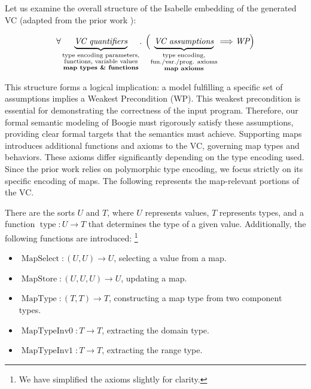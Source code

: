 \documentclass[11pt]{article}
\begin{document}
Let us examine the overall structure of the Isabelle embedding of the generated VC
(adapted from the prior work \cite{parthasarathy2021formally}):


\[
\forall
\underbrace{\textit{VC quantifiers}}_{\substack{
  \text{type encoding parameters,}\\
  \text{functions, variable values}\\
  \textbf{map types \& functions}}}
\mathpunct{.}\;
\Bigl(
\underbrace{\textit{VC assumptions}}_{\substack{
  \text{type encoding,}\\
  \text{fun./var./prog. axioms}\\
  \textbf{map axioms}}}
\Longrightarrow
\textit{WP}
\Bigr)
\]


This structure forms a logical implication:
a model fulfilling a specific set of assumptions implies a Weakest Precondition (WP).
This weakest precondition is essential for demonstrating the correctness of the input program.
Therefore, our formal semantic modeling of Boogie must rigorously satisfy these assumptions,
providing clear formal targets that the semantics must achieve.
Supporting maps introduces additional functions and axioms to the VC,
governing map types and behaviors.
These axioms differ significantly depending on the type encoding used.
Since the prior work relies on polymorphic type encoding,
we focus strictly on its specific encoding of maps.
The following represents the map-relevant portions of the VC.


\newcommand{\MapType}{\operatorname{MapType}}
\newcommand{\MapTypeInvK}{\operatorname{MapTypeInv0}}
\newcommand{\MapTypeInvV}{\operatorname{MapTypeInv1}}
\newcommand{\Select}{\operatorname{MapSelect}}
\newcommand{\Store}{\operatorname{MapStore}}
\newcommand{\type}{\operatorname{type}}


There are the sorts $U$ and $T$, where $U$ represents values, $T$ represents types,
and a function $\type : U \rightarrow T$ that determines the type of a given value.
Additionally, the following functions are introduced:
\footnote{We have simplified the axioms slightly for clarity.}
\begin{itemize} 
  \item $\Select : (U, U) \rightarrow U$, selecting a value from a map.
  \item $\Store : (U, U, U) \rightarrow U$, updating a map.
  \item $\MapType : (T, T) \rightarrow T$, constructing a map type from two component types.
  \item $\MapTypeInvK : T \rightarrow T$, extracting the domain type.
  \item $\MapTypeInvV : T \rightarrow T$, extracting the range type.
\end{itemize} 
\end{document}
